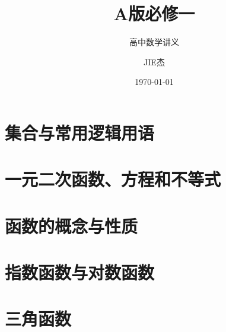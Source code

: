 \documentclass[lang=cn,newtx,10pt,scheme=chinese,nofont]{elegantbook}
\title{A版必修一}
\subtitle{高中数学讲义}
\author{JIE杰}
\institute{JIE杰}
\date{\today}
\begin{document}
\maketitle

\frontmatter
\tableofcontents

\mainmatter


\chapter{集合与常用逻辑用语}


\chapter{一元二次函数、方程和不等式}


\chapter{函数的概念与性质}


\chapter{指数函数与对数函数}


\chapter{三角函数}


%
\end{document}
